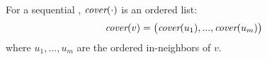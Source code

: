 For a sequential , $\mbox{\rm\em cover}(\cdot)$ is an ordered list:
\begin{equation}
\label{eqn2}
\mbox{\rm\em cover}(v) = \big(\mbox{\rm\em cover}(u_1), ..., \mbox{\rm\em cover}(u_m)\big)
\end{equation}
where $u_1, ..., u_m$ are the ordered in-neighbors of $v$.



